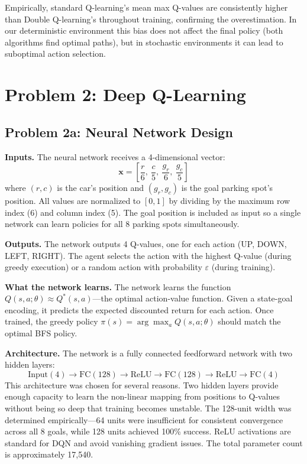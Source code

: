 \documentclass[letterpaper]{article}
\begin{document}
Empirically, standard Q-learning's mean max Q-values are consistently higher than Double Q-learning's throughout training, confirming the overestimation. In our deterministic environment this bias does not affect the final policy (both algorithms find optimal paths), but in stochastic environments it can lead to suboptimal action selection.


\section{Problem 2: Deep Q-Learning}

\subsection{Problem 2a: Neural Network Design}

\textbf{Inputs.} The neural network receives a 4-dimensional vector:
\begin{equation}
    \mathbf{x} = \left[\frac{r}{6},\ \frac{c}{5},\ \frac{g_r}{6},\ \frac{g_c}{5}\right]
\end{equation}
where $(r, c)$ is the car's position and $(g_r, g_c)$ is the goal parking spot's position. All values are normalized to $[0, 1]$ by dividing by the maximum row index (6) and column index (5). The goal position is included as input so a single network can learn policies for all 8 parking spots simultaneously.

\textbf{Outputs.} The network outputs 4 Q-values, one for each action (UP, DOWN, LEFT, RIGHT). The agent selects the action with the highest Q-value (during greedy execution) or a random action with probability $\varepsilon$ (during training).

\textbf{What the network learns.} The network learns the function $Q(s, a; \theta) \approx Q^*(s, a)$---the optimal action-value function. Given a state-goal encoding, it predicts the expected discounted return for each action. Once trained, the greedy policy $\pi(s) = \arg\max_a Q(s, a; \theta)$ should match the optimal BFS policy.

\textbf{Architecture.} The network is a fully connected feedforward network with two hidden layers:
\[
    \text{Input}(4) \to \text{FC}(128) \to \text{ReLU} \to \text{FC}(128) \to \text{ReLU} \to \text{FC}(4)
\]
This architecture was chosen for several reasons. Two hidden layers provide enough capacity to learn the non-linear mapping from positions to Q-values without being so deep that training becomes unstable. The 128-unit width was determined empirically---64 units were insufficient for consistent convergence across all 8 goals, while 128 units achieved 100\% success. ReLU activations are standard for DQN and avoid vanishing gradient issues. The total parameter count is approximately 17,540.
\end{document}
